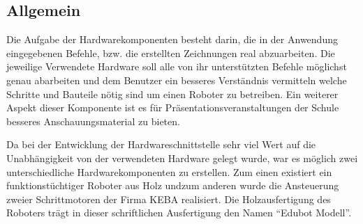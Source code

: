 \subsection{Allgemein}            
Die Aufgabe der Hardwarekomponenten besteht darin, die in der Anwendung eingegebenen Befehle, bzw. die erstellten Zeichnungen real abzuarbeiten. Die jeweilige Verwendete Hardware soll alle von ihr unterstützten Befehle möglichst genau abarbeiten und dem Benutzer ein besseres Verständnis vermitteln welche Schritte und Bauteile nötig sind um einen Roboter zu betreiben.
Ein weiterer Aspekt dieser Komponente ist es für Präsentationsveranstaltungen der Schule besseres Anschauungsmaterial zu bieten.

Da bei der Entwicklung der Hardwareschnittstelle sehr viel Wert auf die Unabhängigkeit von der verwendeten Hardware gelegt wurde, war es möglich zwei unterschiedliche Hardwarekomponenten zu erstellen. Zum einen existiert ein funktionstüchtiger Roboter aus Holz undzum anderen wurde die Ansteuerung zweier Schrittmotoren der Firma KEBA realisiert.
Die Holzausfertigung des Roboters trägt in dieser schriftlichen Ausfertigung den Namen “Edubot Modell”. 